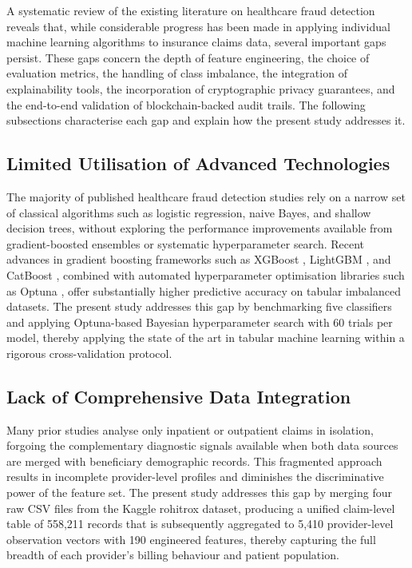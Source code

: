 A systematic review of the existing literature on healthcare fraud detection
reveals that, while considerable progress has been made in applying individual
machine learning algorithms to insurance claims data, several important gaps
persist. These gaps concern the depth of feature engineering, the choice of
evaluation metrics, the handling of class imbalance, the integration of
explainability tools, the incorporation of cryptographic privacy guarantees, and
the end-to-end validation of blockchain-backed audit trails. The following
subsections characterise each gap and explain how the present study addresses it.

\subsection{Limited Utilisation of Advanced Technologies}

The majority of published healthcare fraud detection studies rely on a narrow set
of classical algorithms such as logistic regression, naive Bayes, and shallow
decision trees, without exploring the performance improvements available from
gradient-boosted ensembles or systematic hyperparameter search. Recent advances in
gradient boosting frameworks such as XGBoost \cite{chen2016}, LightGBM
\cite{ke2017}, and CatBoost \cite{prokhorenkova2018}, combined with automated
hyperparameter optimisation libraries such as Optuna \cite{akiba2019}, offer
substantially higher predictive accuracy on tabular imbalanced datasets. The
present study addresses this gap by benchmarking five classifiers and applying
Optuna-based Bayesian hyperparameter search with 60 trials per model, thereby
applying the state of the art in tabular machine learning within a rigorous
cross-validation protocol.

\subsection{Lack of Comprehensive Data Integration}

Many prior studies analyse only inpatient or outpatient claims in isolation,
forgoing the complementary diagnostic signals available when both data sources are
merged with beneficiary demographic records. This fragmented approach results in
incomplete provider-level profiles and diminishes the discriminative power of the
feature set. The present study addresses this gap by merging four raw CSV files
from the Kaggle rohitrox dataset, producing a unified claim-level table of
558,211 records that is subsequently aggregated to 5,410 provider-level
observation vectors with 190 engineered features, thereby capturing the full
breadth of each provider's billing behaviour and patient population.


